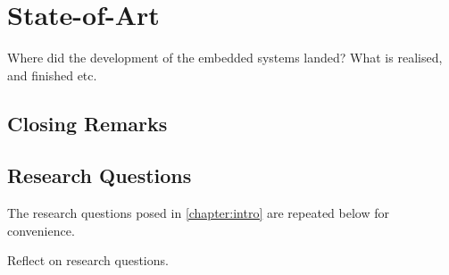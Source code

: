 \chapter{State-of-Art}
\label{chapter:conc}
Where did the development of the embedded systems landed? What is realised, and finished etc. 
\section{Closing Remarks}
\label{section:conc-closing-remarks}

\section{Research Questions}
\label{section:conc-research-questions}

The research questions posed in \cref{chapter:intro} are repeated below for convenience.


Reflect on research questions.